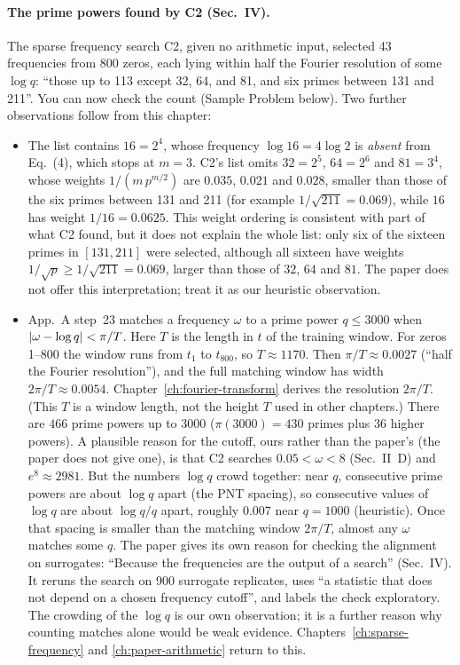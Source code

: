\paragraph{The prime powers found by C2 (Sec.~IV).} The sparse frequency search C2, given no arithmetic input, selected 43 frequencies from 800 zeros, each lying within half the Fourier resolution of some $\log q$: ``those up to 113 except 32, 64, and 81, and six primes between 131 and 211''. You can now check the count (Sample Problem below). Two further observations follow from this chapter:
\begin{itemize}
\item The list contains $16=2^4$, whose frequency $\log16=4\log2$ is \emph{absent} from Eq.~(4), which stops at $m=3$. C2's list omits $32=2^5$, $64=2^6$ and $81=3^4$, whose weights $1/(m\,p^{m/2})$ are $0.035$, $0.021$ and $0.028$, smaller than those of the six primes between 131 and 211 (for example $1/\sqrt{211}=0.069$), while $16$ has weight $1/16=0.0625$. This weight ordering is consistent with part of what C2 found, but it does not explain the whole list: only six of the sixteen primes in $[131,211]$ were selected, although all sixteen have weights $1/\sqrt p\ge1/\sqrt{211}=0.069$, larger than those of $32$, $64$ and $81$. The paper does not offer this interpretation; treat it as our heuristic observation.
\item App.~A step~23 matches a frequency $\omega$ to a prime power $q\le3000$ when $\left\lvert \omega-\log q\right\rvert<\pi/T$. Here $T$ is the length in $t$ of the training window. For zeros 1--800 the window runs from $t_1$ to $t_{800}$, so $T\approx1170$. Then $\pi/T\approx0.0027$ (``half the Fourier resolution''), and the full matching window has width $2\pi/T\approx0.0054$. Chapter~\ref{ch:fourier-transform} derives the resolution $2\pi/T$. (This $T$ is a window length, not the height $T$ used in other chapters.) There are $466$ prime powers up to $3000$ ($\pi(3000)=430$ primes plus $36$ higher powers). A plausible reason for the cutoff, ours rather than the paper's (the paper does not give one), is that C2 searches $0.05<\omega<8$ (Sec.~II~D) and $e^8\approx2981$. But the numbers $\log q$ crowd together: near $q$, consecutive prime powers are about $\log q$ apart (the PNT spacing), so consecutive values of $\log q$ are about $\log q/q$ apart, roughly $0.007$ near $q=1000$ (heuristic). Once that spacing is smaller than the matching window $2\pi/T$, almost any $\omega$ matches some $q$. The paper gives its own reason for checking the alignment on surrogates: ``Because the frequencies are the output of a search'' (Sec.~IV). It reruns the search on 900 surrogate replicates, uses ``a statistic that does not depend on a chosen frequency cutoff'', and labels the check exploratory. The crowding of the $\log q$ is our own observation; it is a further reason why counting matches alone would be weak evidence. Chapters~\ref{ch:sparse-frequency} and \ref{ch:paper-arithmetic} return to this.
\end{itemize}

